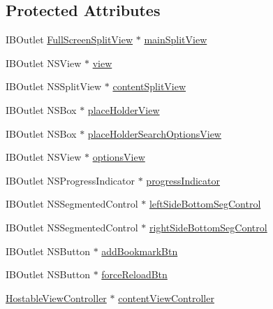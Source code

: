 \subsection*{Protected Attributes}
\begin{DoxyCompactItemize}
\item 
I\-B\-Outlet \hyperlink{interface_full_screen_split_view}{Full\-Screen\-Split\-View} $\ast$ \hyperlink{interface_window_host_controller_a2e15c659bc5be433b9b85c4a5d8e78f5}{main\-Split\-View}
\item 
I\-B\-Outlet N\-S\-View $\ast$ \hyperlink{interface_window_host_controller_a88e9b5588420551f9537792f22670ead}{view}
\item 
I\-B\-Outlet N\-S\-Split\-View $\ast$ \hyperlink{interface_window_host_controller_aa1713f0f82ab2a192f47c6b561992907}{content\-Split\-View}
\item 
I\-B\-Outlet N\-S\-Box $\ast$ \hyperlink{interface_window_host_controller_a9a9977454586999c31286b17841fe58b}{place\-Holder\-View}
\item 
I\-B\-Outlet N\-S\-Box $\ast$ \hyperlink{interface_window_host_controller_ad0134d2b55bf1ab4b69e986c2b0edc44}{place\-Holder\-Search\-Options\-View}
\item 
I\-B\-Outlet N\-S\-View $\ast$ \hyperlink{interface_window_host_controller_a00127015b86c47d6c9a83fffc5d6bed8}{options\-View}
\item 
I\-B\-Outlet N\-S\-Progress\-Indicator $\ast$ \hyperlink{interface_window_host_controller_a8d8847912bf02123b1ed3e8a70e6ed7e}{progress\-Indicator}
\item 
I\-B\-Outlet N\-S\-Segmented\-Control $\ast$ \hyperlink{interface_window_host_controller_a4b804ec22d1ef2d1fe15cae4ff6708ed}{left\-Side\-Bottom\-Seg\-Control}
\item 
I\-B\-Outlet N\-S\-Segmented\-Control $\ast$ \hyperlink{interface_window_host_controller_adcab827eb36b1a7a389988bb3c235127}{right\-Side\-Bottom\-Seg\-Control}
\item 
I\-B\-Outlet N\-S\-Button $\ast$ \hyperlink{interface_window_host_controller_ab40e38814ec10120dad9db6618238119}{add\-Bookmark\-Btn}
\item 
I\-B\-Outlet N\-S\-Button $\ast$ \hyperlink{interface_window_host_controller_a5a0bd67b80255923e8e4faed0cb5b93a}{force\-Reload\-Btn}
\item 
\hyperlink{interface_hostable_view_controller}{Hostable\-View\-Controller} $\ast$ \hyperlink{interface_window_host_controller_a1ec163d3953f695d7ac4f2ee768c6a9a}{content\-View\-Controller}
\item 

\end{DoxyCompactItemize}
